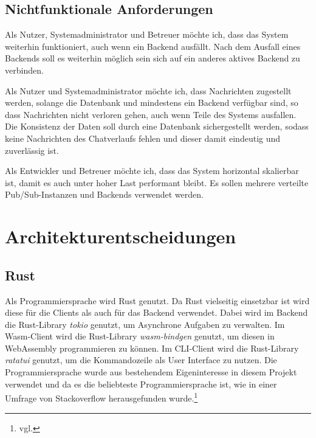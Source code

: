 \subsection{Nichtfunktionale Anforderungen}
\begin{description}[style=nextline]
    \item [Hohe Verfügbarkeit]
        Als Nutzer, Systemadministrator und Betreuer möchte ich, dass das System weiterhin funktioniert, auch wenn ein Backend ausfällt. Nach dem Ausfall eines Backends soll es weiterhin möglich sein sich auf ein anderes aktives Backend zu verbinden.
    \item [Zuverlässigkeit] 
        Als Nutzer und Systemadministrator möchte ich, dass Nachrichten zugestellt werden, solange die Datenbank und mindestens ein Backend verfügbar sind, so dass Nachrichten nicht verloren gehen, auch wenn Teile des Systems ausfallen. Die Konsistenz der Daten soll durch eine Datenbank sichergestellt werden, sodass keine Nachrichten des Chatverlaufs fehlen und dieser damit eindeutig und zuverlässig ist.
    \item [Skalierbarkeit] 
        Als Entwickler und Betreuer möchte ich, dass das System horizontal skalierbar ist, damit es auch unter hoher Last performant bleibt. Es sollen mehrere verteilte Pub/Sub-Instanzen und Backends verwendet werden.
\end{description}

\section{Architekturentscheidungen}

\subsection{Rust}
Als Programmiersprache wird Rust genutzt.
Da Rust vielseitig einsetzbar ist wird diese für die Clients als auch für das Backend verwendet.
Dabei wird im Backend die Rust-Library \textit{tokio} genutzt, um Asynchrone Aufgaben zu verwalten.
Im \ac{Wasm}-Client wird die Rust-Library \textit{wasm-bindgen} genutzt, um diesen in WebAssembly programmieren zu können.
Im \ac{CLI}-Client wird die Rust-Library \textit{ratatui} genutzt, um die Kommandozeile als User Interface zu nutzen.
Die Programmiersprache wurde aus bestehendem Eigeninteresse in diesem Projekt verwendet und da es die beliebteste Programmiersprache ist, wie in einer Umfrage von Stackoverflow herausgefunden wurde.\footnote{vgl. }


